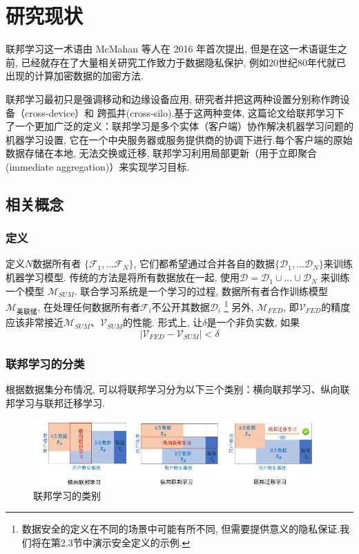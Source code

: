 \documentclass[a4paper]{article}
\begin{document}
\section{研究现状} 
联邦学习这一术语由 McMahan 等人在 2016 年首次提出, 但是在这一术语诞生之前, 已经就存在了大量相关研究工作致力于数据隐私保护, 例如20世纪80年代就已出现的计算加密数据的加密方法.

联邦学习最初只是强调移动和边缘设备应用, 研究者并把这两种设置分别称作跨设备（cross-device）和 跨孤井(cross-silo).基于这两种变体, 这篇论文给联邦学习下了一个更加广泛的定义：联邦学习是多个实体（客户端）协作解决机器学习问题的机器学习设置, 它在一个中央服务器或服务提供商的协调下进行.每个客户端的原始数据存储在本地, 无法交换或迁移, 联邦学习利用局部更新（用于立即聚合 (immediate aggregation)）来实现学习目标.

\subsection{相关概念}

\subsubsection{定义}

 
定义$N$数据所有者 $\{\mathcal{F}_1, ...\mathcal{F}_N\}$, 它们都希望通过合并各自的数据$\{\mathcal{D}_1, ...\mathcal{D}_N\}$来训练机器学习模型.
传统的方法是将所有数据放在一起, 使用$\mathcal{D} = \mathcal{D}_1 \cup ...\cup\mathcal{D}_N$ 来训练一个模型 $\mathcal{M}_{SUM}$.
联合学习系统是一个学习的过程, 数据所有者合作训练模型$\mathcal {M} _{美联储}$, 在处理任何数据所有者$ \mathcal {F} _i$不公开其数据$\mathcal {D} _i$  \footnote{数据安全的定义在不同的场景中可能有所不同, 但需要提供意义的隐私保证.我们将在第2.3节中演示安全定义的示例.}
另外, $\mathcal{M}_{FED}$, 即$\mathcal{V}_{FED}$的精度应该非常接近$\mathcal{M}_{SUM}$、$\mathcal{V}_{SUM}$的性能.
形式上, 让$\delta$是一个非负实数, 如果
\begin{equation}\label{define}
 \mid \mathcal{V}_{FED} - \mathcal{V}_{SUM} \mid < \delta
\end{equation}


\subsubsection{联邦学习的分类} 
根据数据集分布情况, 可以将联邦学习分为以下三个类别：横向联邦学习、纵向联邦学习与联邦迁移学习.
\begin{figure}
    \centering
    \includegraphics[width=\textwidth]{Categorization_of_FL.jpg}
    \caption{联邦学习的类别}
\end{figure}
\end{document}
